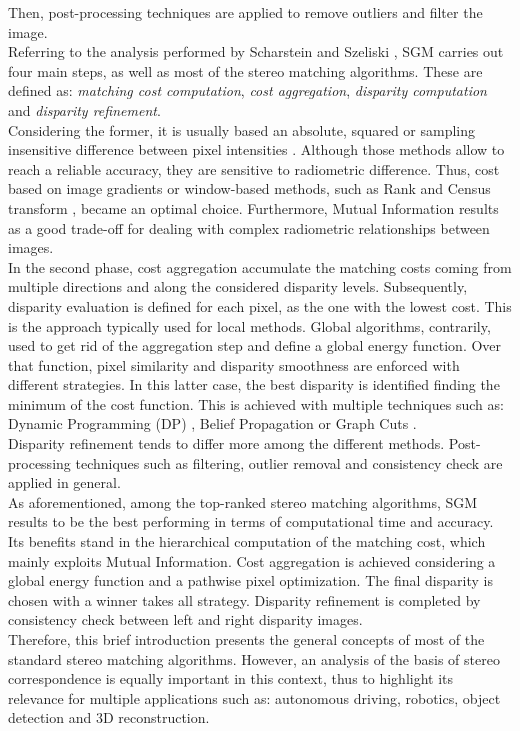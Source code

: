 Then, post-processing techniques are applied to remove outliers and filter the image.\\
Referring to the analysis performed by Scharstein and Szeliski \cite{Scharstein2001}, SGM carries out four main steps, as well as most of the stereo matching algorithms. 
These are defined as: \textit{matching cost computation}, \textit{cost aggregation}, \textit{disparity computation} and \textit{disparity refinement}. \\
Considering the former, it is usually based an absolute, squared or sampling insensitive difference between pixel intensities \cite{Hirschmuller2008}. 
Although those methods allow to reach a reliable accuracy, they are sensitive to radiometric difference. 
Thus, cost based on image gradients or window-based methods, such as Rank and Census transform \cite{Ko2017}, became an optimal choice. 
Furthermore, Mutual Information results as a good trade-off for dealing with complex radiometric relationships between images.\\
In the second phase, cost aggregation accumulate the matching costs coming from multiple directions and along the considered disparity levels. 
Subsequently, disparity evaluation is defined for each pixel, as the one with the lowest cost.
This is the approach typically used for local methods. 
Global algorithms, contrarily, used to get rid of the aggregation step and define a global energy function. 
Over that function, pixel similarity and disparity smoothness are enforced with different strategies. 
In this latter case, the best disparity is identified finding the minimum of the cost function. 
This is achieved with multiple techniques such as: Dynamic Programming (DP) \cite{Birchfield1999}, Belief Propagation \cite{Klaus2006} or Graph Cuts \cite{Kolmogorov2001}.\\
Disparity refinement tends to differ more among the different methods. 
Post-processing techniques such as filtering, outlier removal and consistency check are applied in general.\\
As aforementioned, among the top-ranked stereo matching algorithms, SGM results to be the best performing in terms of computational time and accuracy. 
Its benefits stand in the hierarchical computation of the matching cost, which mainly exploits Mutual Information. 
Cost aggregation is achieved considering a global energy function and a pathwise pixel optimization. 
The final disparity is chosen with a winner takes all strategy. 
Disparity refinement is completed by consistency check between left and right disparity images. \\
Therefore, this brief introduction presents the general concepts of most of the standard stereo matching algorithms.
However, an analysis of the basis of stereo correspondence is equally important in this context, thus to highlight its relevance for multiple applications such as: autonomous driving, robotics, object detection and 3D reconstruction.


